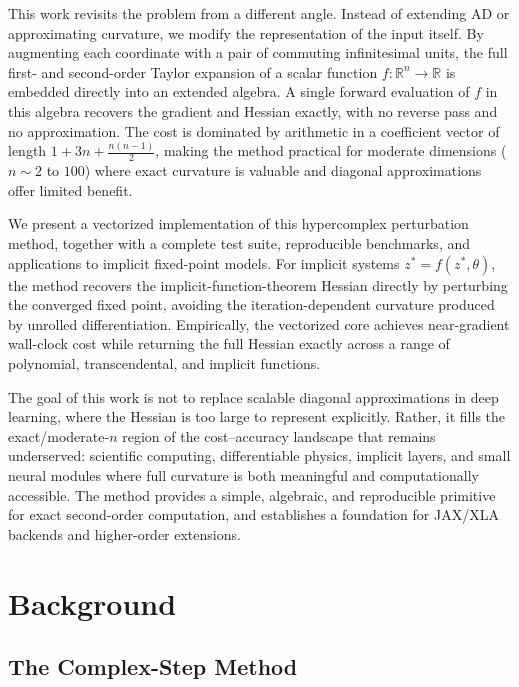 \documentclass[11pt]{article}
\begin{document}
This work revisits the problem from a different angle. Instead of extending AD or
approximating curvature, we modify the representation of the input itself. By
augmenting each coordinate with a pair of commuting infinitesimal units, the full
first- and second-order Taylor expansion of a scalar function $f:\mathbb{R}^n \to
\mathbb{R}$ is embedded directly into an extended algebra. A single forward evaluation
of $f$ in this algebra recovers the gradient and Hessian exactly, with no reverse pass
and no approximation. The cost is dominated by arithmetic in a coefficient vector of
length $1 + 3n + \frac{n(n-1)}{2}$, making the method practical for moderate
dimensions ($n \sim 2$ to $100$) where exact curvature is valuable and diagonal
approximations offer limited benefit.

We present a vectorized implementation of this hypercomplex perturbation method,
together with a complete test suite, reproducible benchmarks, and applications to
implicit fixed-point models. For implicit systems $z^* = f(z^*, \theta)$, the method
recovers the implicit-function-theorem Hessian directly by perturbing the converged
fixed point, avoiding the iteration-dependent curvature produced by unrolled
differentiation. Empirically, the vectorized core achieves near-gradient wall-clock
cost while returning the full Hessian exactly across a range of polynomial,
transcendental, and implicit functions.

The goal of this work is not to replace scalable diagonal approximations in deep
learning, where the Hessian is too large to represent explicitly. Rather, it fills the
exact/moderate-$n$ region of the cost--accuracy landscape that remains underserved:
scientific computing, differentiable physics, implicit layers, and small neural
modules where full curvature is both meaningful and computationally accessible. The
method provides a simple, algebraic, and reproducible primitive for exact second-order
computation, and establishes a foundation for JAX/XLA backends and higher-order
extensions.

\section{Background}

\subsection{The Complex-Step Method}
\end{document}
